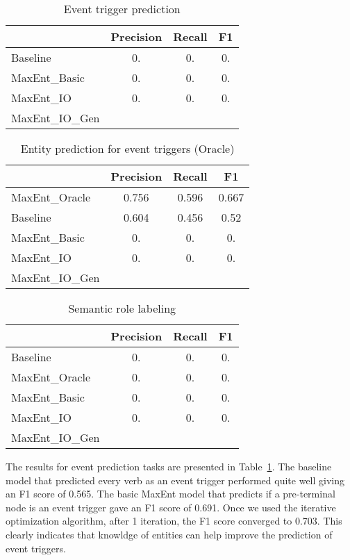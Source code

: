 
\begin{table}
\centering
\begin{tabular}{|l||c|c|c|} \hline
&\textbf{Precision} & \textbf{Recall} & \textbf{F1} \\ \hline
\hline
Baseline& 0. & 0. &0.\\
MaxEnt\_Basic& 0. & 0.&  0. \\
MaxEnt\_IO&0.&0.&0.\\
MaxEnt\_IO\_Gen&&&\\
\hline
\end{tabular}
\caption{Event trigger prediction}
\label{table:eventprediction}
\end{table}

\begin{table}
\centering
\begin{tabular}{|l||c|c|c|} \hline
&\textbf{Precision} & \textbf{Recall} & \textbf{F1} \\ \hline
\hline
MaxEnt\_Oracle&0.756&0.596&0.667\\
Baseline&0.604&0.456&0.52\\
MaxEnt\_Basic&0.&0.&0.\\
MaxEnt\_IO&0.&0.&0.\\
MaxEnt\_IO\_Gen&&&\\
\hline
\end{tabular}
\caption{Entity prediction for event triggers (Oracle)}
\label{table:entityprediction}
\end{table}

\begin{table}
\centering
\begin{tabular}{|l||c|c|c|} \hline
&\textbf{Precision} & \textbf{Recall} & \textbf{F1} \\ \hline
\hline
Baseline&0.&0.&0.\\
MaxEnt\_Oracle&0.&0.&0.\\
MaxEnt\_Basic&0.&0.&0.\\
MaxEnt\_IO&0.&0.&0.\\
MaxEnt\_IO\_Gen&&&\\
\hline
\end{tabular}
\caption{Semantic role labeling}
\label{table:srlprediction}
\end{table}

The results for event prediction tasks are presented in Table~\ref{table:eventprediction}. The baseline model that predicted every verb as an event trigger performed quite well giving an F1 score of 0.565. The basic MaxEnt model that predicts if a pre-terminal node is an event trigger gave an F1 score of 0.691. Once we used the iterative optimization algorithm, after 1 iteration, the F1 score converged to 0.703. This clearly indicates that knowldge of entities can help improve the prediction of event triggers.

